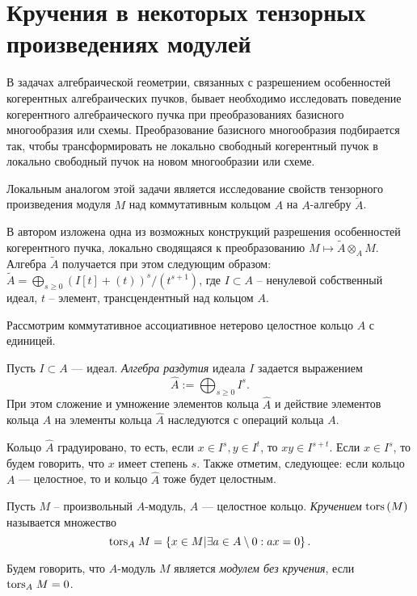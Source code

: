\section{Кручения в некоторых тензорных произведениях модулей}
    В задачах алгебраической геометрии, связанных с разрешением особенностей когерентных 
    алгебраических пучков, бывает необходимо 
    исследовать поведение когерентного алгебраического пучка при преобразованиях базисного 
    многообразия или схемы.
    Преобразование базисного многообразия подбирается так, чтобы трансформировать не локально 
    свободный когерентный пучок в локально
    свободный пучок на новом многообразии или схеме. 

    Локальным аналогом этой задачи является исследование свойств тензорного произведения модуля $M$ 
    над коммутативным кольцом $A$ на $A$-алгебру $\widetilde{A}$.

    В \cite{Timofeeva} автором изложена одна из возможных конструкций разрешения особенностей когерентного пучка, 
    локально сводящаяся к преобразованию $M \mapsto \widetilde{A} \otimes_A M$.
    Алгебра $\widetilde{A}$ получается при этом следующим образом: 
    $\widetilde{A} = \bigoplus_{s \geq 0} (I[t] + (t))^s / (t^{s + 1})$, где $I \subset A$ -- 
    ненулевой собственный
    идеал, $t$ -- элемент, трансцендентный над кольцом $A$.

    Рассмотрим коммутативное ассоциативное нетерово целостное кольцо $A$ с единицей. 
    
    \begin{Def}
        Пусть $I \subset A$ --- идеал. \textit{Алгебра раздутия} идеала $I$ задается выражением 
        $$\widehat{A} := \bigoplus_{s \geq 0} I^s.$$
        При этом сложение и умножение элементов кольца $\widehat{A}$ и действие элементов кольца $A$
        на элементы кольца $\widehat{A}$ наследуются с операций кольца $A$.
    \end{Def}
    Кольцо $\widehat{A}$ градуировано, то есть, если $x \in I^s, y \in I^t$, то $xy \in I^{s + t}$.
    Если $x \in I^s$, то будем говорить, что $x$ имеет степень $s$.
    Также отметим, следующее: если кольцо $A$ --- целостное, то и кольцо $\hat A$ тоже будет целостным.

    \begin{Def}
        Пусть $M$ -- произвольный $A$-модуль, $A$ --- целостное кольцо. 
        \textit{Кручением} $\textup{tors}\left(M\right)$ называется множество
        \begin{equation*}
            \textup{tors}_{A}\;M = \left\{x \in M | \exists a \in A\setminus 0 : ax = 0 \right\}.
        \end{equation*}
    \end{Def}
    \begin{Def}
        Будем говорить, что $A$-модуль $M$ является \textit{модулем без кручения}, если $\textup{tors}_{A}\;M = 0$.
    \end{Def}

